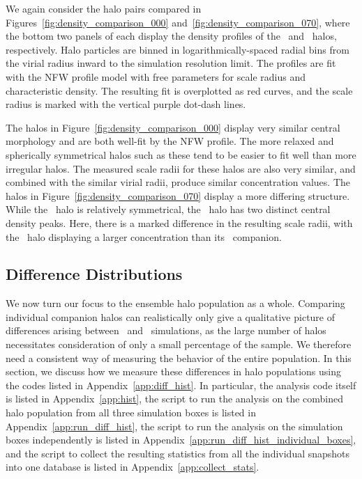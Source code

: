 We again consider the halo pairs compared in Figures~\ref{fig:density_comparison_000} and~\ref{fig:density_comparison_070}, where the bottom two panels of each display the density profiles of the \lpt\ and \za\ halos, respectively.  Halo particles are binned in logarithmically-spaced radial bins from the virial radius inward to the simulation resolution limit.  The profiles are fit with the NFW profile model with free parameters for scale radius and characteristic density.  The resulting fit is overplotted as red curves, and the scale radius is marked with the vertical purple dot-dash lines.

The halos in Figure~\ref{fig:density_comparison_000} display very similar central morphology and are both well-fit by the NFW profile.  The more relaxed and spherically symmetrical halos such as these tend to be easier to fit well than more irregular halos.  The measured scale radii for these halos are also very similar, and combined with the similar virial radii, produce similar concentration values.  The halos in Figure~\ref{fig:density_comparison_070} display a more differing structure.  While the \lpt\ halo is relatively symmetrical, the \za\ halo has two distinct central density peaks.  Here, there is a marked difference in the resulting scale radii, with the \lpt\ halo displaying a larger concentration than its \za\ companion.




\subsection{Difference Distributions}
\label{subsec:analysis--difference_histograms}


We now turn our focus to the ensemble halo population as a whole.  Comparing individual companion halos can realistically only give a qualitative picture of differences arising between \lpt\ and \za\ simulations, as the large number of halos necessitates consideration of only a small percentage of the sample.  We therefore need a consistent way of measuring the behavior of the entire population.  In this section, we discuss how we measure these differences in halo populations using the codes listed in Appendix~\ref{app:diff_hist}.  In particular, the analysis code itself is listed in Appendix~\ref{app:hist}, the script to run the analysis on the combined halo population from all three simulation boxes is listed in Appendix~\ref{app:run_diff_hist}, the script to run the analysis on the simulation boxes independently is listed in Appendix~\ref{app:run_diff_hist_individual_boxes}, and the script to collect the resulting statistics from all the individual snapshots into one database is listed in Appendix~\ref{app:collect_stats}.



